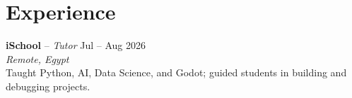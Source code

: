 \section{Experience}
\resumeSubHeadingListStart

    \item
    \begin{minipage}[t]{\linewidth}
      \textbf{iSchool} -- \textit{\small Tutor} \hfill {\footnotesize Jul -- Aug 2026} \\
      \textit{\footnotesize Remote, Egypt} \\[2pt]
      \footnotesize{Taught Python, AI, Data Science, and Godot; guided students in building and debugging projects.}
    \end{minipage}\vspace{-4pt}

\resumeSubHeadingListEnd